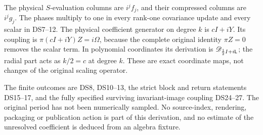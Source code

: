The physical \(S\)-evaluation columns are \(i^jf_j\), and their
compressed columns are \(i^jg_j\). The phases multiply to one in every
rank-one covariance update and every scalar in DS7--12. The physical
coefficient generator on degree \(k\) is
\(cI+iY\). Its coupling is
\(\pi(cI+iY)Z=i\Omega\), because the complete original identity
\(\pi Z=0\) removes the scalar term. In polynomial coordinates its
derivation is \(\mathscr D_{\frac12I+i\mathsf L}\); the radial part acts
as \(k/2=c\) at degree \(k\). These are exact coordinate maps,
not changes of the original scaling operator.

The finite outcomes are DS8, DS10--13, the strict block and return
statements DS15--17, and the fully specified surviving invariant-image
coupling DS24--27. The original period has not been numerically sampled.
No source-index, rendering, packaging or publication action is part of
this derivation, and no estimate of the unresolved coefficient is
deduced from an algebra fixture.

